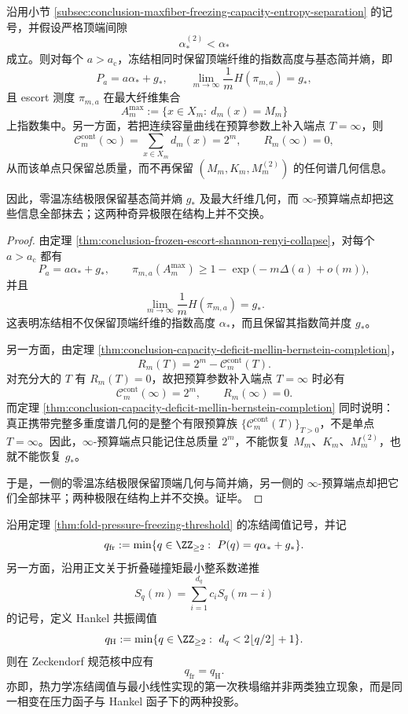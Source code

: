 \begin{theorem}\label{thm:conclusion-freezing-infinity-budget-noncommutation}
沿用小节 \ref{subsec:conclusion-maxfiber-freezing-capacity-entropy-separation} 的记号，并假设严格顶端间隙
\[
\alpha_\ast^{(2)}<\alpha_\ast
\]
成立。则对每个 \(a>a_{\mathrm c}\)，冻结相同时保留顶端纤维的指数高度与基态简并熵，即
\[
P_a=a\alpha_\ast+g_\ast,
\qquad
\lim_{m\to\infty}\frac{1}{m}H(\pi_{m,a})=g_\ast,
\]
且 escort 测度 \(\pi_{m,a}\) 在最大纤维集合
\[
A_m^{\max}:=\{x\in X_m:\ d_m(x)=M_m\}
\]
上指数集中。另一方面，若把连续容量曲线在预算参数上补入端点 \(T=\infty\)，则
\[
\mathcal C_m^{\mathrm{cont}}(\infty)=\sum_{x\in X_m}d_m(x)=2^m,
\qquad
R_m(\infty)=0,
\]
从而该单点只保留总质量，而不再保留 \((M_m,K_m,M_m^{(2)})\) 的任何谱几何信息。

因此，零温冻结极限保留基态简并熵 \(g_\ast\) 及最大纤维几何，而 \(\infty\)-预算端点却把这些信息全部抹去；这两种奇异极限在结构上并不交换。
\end{theorem}
\begin{proof}
由定理 \ref{thm:conclusion-frozen-escort-shannon-renyi-collapse}，对每个 \(a>a_{\mathrm c}\) 都有
\[
P_a=a\alpha_\ast+g_\ast,
\qquad
\pi_{m,a}(A_m^{\max})\ge 1-\exp\!\bigl(-m\Delta(a)+o(m)\bigr),
\]
并且
\[
\lim_{m\to\infty}\frac{1}{m}H(\pi_{m,a})=g_\ast.
\]
这表明冻结相不仅保留顶端纤维的指数高度 \(\alpha_\ast\)，而且保留其指数简并度 \(g_\ast\)。

另一方面，由定理 \ref{thm:conclusion-capacity-deficit-mellin-bernstein-completion}，
\[
R_m(T)=2^m-\mathcal C_m^{\mathrm{cont}}(T).
\]
对充分大的 \(T\) 有 \(R_m(T)=0\)，故把预算参数补入端点 \(T=\infty\) 时必有
\[
\mathcal C_m^{\mathrm{cont}}(\infty)=2^m,
\qquad
R_m(\infty)=0.
\]
而定理 \ref{thm:conclusion-capacity-deficit-mellin-bernstein-completion} 同时说明：真正携带完整多重度谱几何的是整个有限预算族 \(\{\mathcal C_m^{\mathrm{cont}}(T)\}_{T>0}\)，不是单点 \(T=\infty\)。因此，\(\infty\)-预算端点只能记住总质量 \(2^m\)，不能恢复 \(M_m\)、\(K_m\)、\(M_m^{(2)}\)，也就不能恢复 \(g_\ast\)。

于是，一侧的零温冻结极限保留顶端几何与简并熵，另一侧的 \(\infty\)-预算端点却把它们全部抹平；两种极限在结构上并不交换。证毕。
\end{proof}

\begin{conjecture}\label{conj:conclusion-freezing-hankel-threshold-coincidence}
沿用定理 \ref{thm:fold-pressure-freezing-threshold} 的冻结阈值记号，并记
\[
q_{\mathrm{fr}}
:=
\min\{q\in\ZZ_{\ge 2}:\ P(q)=q\alpha_\ast+g_\ast\}.
\]
另一方面，沿用正文关于折叠碰撞矩最小整系数递推
\[
S_q(m)=\sum_{i=1}^{d_q}c_iS_q(m-i)
\]
的记号，定义 Hankel 共振阈值
\[
q_{\mathrm H}
:=
\min\{q\in\ZZ_{\ge 2}:\ d_q<2\lfloor q/2\rfloor+1\}.
\]
则在 Zeckendorf 规范核中应有
\[
q_{\mathrm{fr}}=q_{\mathrm H}.
\]
亦即，热力学冻结阈值与最小线性实现的第一次秩塌缩并非两类独立现象，而是同一相变在压力函子与 Hankel 函子下的两种投影。
\end{conjecture}
